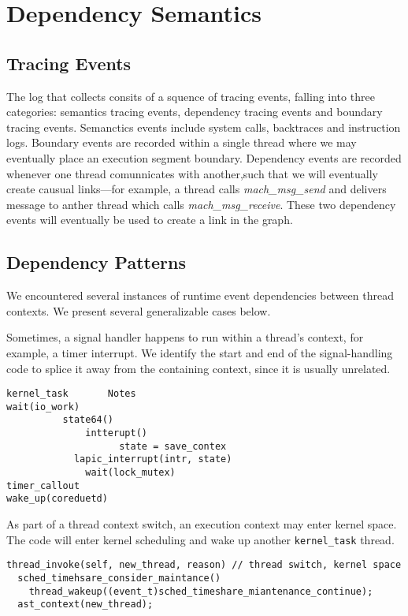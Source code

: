 \section{Dependency Semantics}
\subsection{Tracing Events}
The log that \xxx collects consits of a squence of tracing events, falling into three categories:
semantics tracing events, dependency tracing events and boundary tracing events.
Semanctics events include system calls, backtraces and instruction logs.
Boundary events are recorded within a single thread where we may eventually place an execution segment boundary.
Dependency events are recorded whenever one thread comunnicates with another,such that we will eventually create causual links---for example, a thread calls \textit{mach\_msg\_send} and delivers message to anther thread which calls \textit{mach\_msg\_receive}. These two dependency events will eventually be used to create a link in the graph.


\subsection{Dependency Patterns}
\label{sec:patterns}

We encountered several instances of runtime event dependencies between thread
contexts. We present several generalizable cases below.

Sometimes, a signal handler happens to run within a thread's context, for
example, a timer interrupt. We identify the start and end of the
signal-handling code to splice it away from the containing context, since it is
usually unrelated.

{\footnotesize \begin{verbatim}
kernel_task       Notes
wait(io_work)
		  state64()
	          intterupt()
                    state = save_contex  
		    lapic_interrupt(intr, state)
	          wait(lock_mutex)
timer_callout
wake_up(coreduetd)
\end{verbatim}
}

As part of a thread context switch, an execution context may enter kernel
space. The code will enter kernel scheduling and wake up another
\texttt{kernel\_task} thread.

{\footnotesize \begin{verbatim}
thread_invoke(self, new_thread, reason) // thread switch, kernel space
  sched_timehsare_consider_maintance()
    thread_wakeup((event_t)sched_timeshare_miantenance_continue);
  ast_context(new_thread);
\end{verbatim}
}

